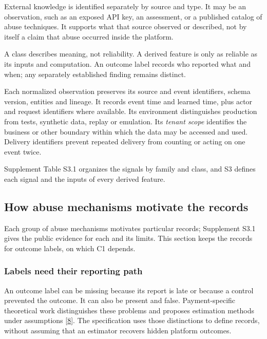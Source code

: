 \documentclass[acmlarge,review,anonymous,nonacm]{acmart}
\begin{document}
External knowledge is identified separately by source and type. It may
be an observation, such as an exposed API key, an assessment, or a
published catalog of abuse techniques. It supports what that source
observed or described, not by itself a claim that abuse occurred inside
the platform.

A class describes meaning, not reliability. A derived feature is only as
reliable as its inputs and computation. An outcome label records who
reported what and when; any separately established finding remains
distinct.

Each normalized observation preserves its source and event identifiers,
schema version, entities and lineage. It records event time and learned
time, plus actor and request identifiers where available. Its
environment distinguishes production from tests, synthetic data, replay
or emulation. Its \emph{tenant scope} identifies the business or other
boundary within which the data may be accessed and used. Delivery
identifiers prevent repeated delivery from counting or acting on one
event twice.

Supplement Table S3.1 organizes the signals by family and class, and S3
defines each signal and the inputs of every derived feature.

\hypertarget{how-abuse-mechanisms-motivate-the-records}{%
\subsection{How abuse mechanisms motivate the
records}\label{how-abuse-mechanisms-motivate-the-records}}

Each group of abuse mechanisms motivates particular records; Supplement
S3.1 gives the public evidence for each and its limits. This section
keeps the records for outcome labels, on which C1 depends.

\hypertarget{labels-need-their-reporting-path}{%
\subsubsection*{Labels need their reporting
path}\label{labels-need-their-reporting-path}}

An outcome label can be missing because its report is late or because a
control prevented the outcome. It can also be present and false.
Payment-specific theoretical work distinguishes these problems and
proposes estimation methods under assumptions
{[}\protect\hyperlink{ref-Dhama2026Causal}{8}{]}. The specification uses
those distinctions to define records, without assuming that an estimator
recovers hidden platform outcomes.
\end{document}
